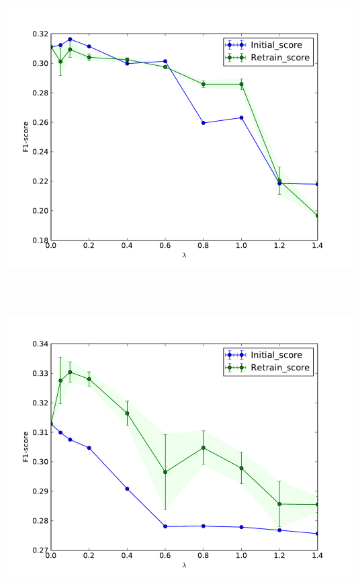 \begin{figure}[!htp]
\begin{subfigure}[!htbp]{0.45\textwidth}
		\caption{}
		\label{evidence_I_D}
	\end{subfigure}
	\newline
	\vspace{-1mm}
	\begin{subfigure}[!htbp]{0.45\textwidth}
		\includegraphics[width=\textwidth]{plots/smerdov/lambda_I_I.pdf}
		\caption{}
		\label{score_I_I}
	\end{subfigure}
	~
	\begin{subfigure}[!htbp]{0.45\textwidth}
		\includegraphics[width=\textwidth]{plots/smerdov/lambda_D_I.pdf}

\end{subfigure}
\end{figure}
